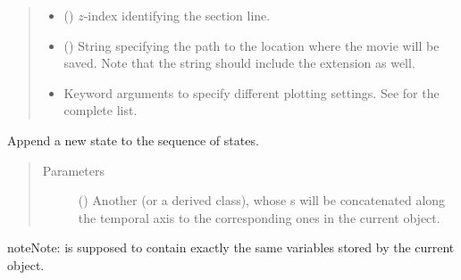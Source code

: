 \documentclass[letterpaper,10pt,english]{sphinxmanual}
\begin{document}
\begin{fulllineitems}
\begin{fulllineitems}
\begin{quote}
\begin{description}
\begin{itemize}
\item {} 
 () \textendash{} \(z\)-index identifying the section line.

\item {} 
 () \textendash{} String specifying the path to the location where the movie will be saved.
Note that the string should include the extension as well.

\item {} 
 \textendash{} Keyword arguments to specify different plotting settings.
See {\hyperref[\detokenize{api:tasmania.utils.utils_plot.animation_profile_x}]{}} for the complete list.

\end{itemize}

\end{description}\end{quote}

\end{fulllineitems}


\begin{fulllineitems}
\label{\detokenize{api:storages.grid_data.GridData.append}}
Append a new state to the sequence of states.
\begin{quote}\begin{description}
\item[{Parameters}] \leavevmode
{} () \textendash{} Another {\hyperref[\detokenize{api:storages.grid_data.GridData}]{}} (or a derived class), whose s
will be concatenated along the temporal axis to the corresponding ones in the current object.

\end{description}\end{quote}

\begin{sphinxadmonition}{note}{Note:}
 is supposed to contain exactly the same variables stored by the current object.
\end{sphinxadmonition}


\end{fulllineitems}
\end{fulllineitems}
\end{document}
